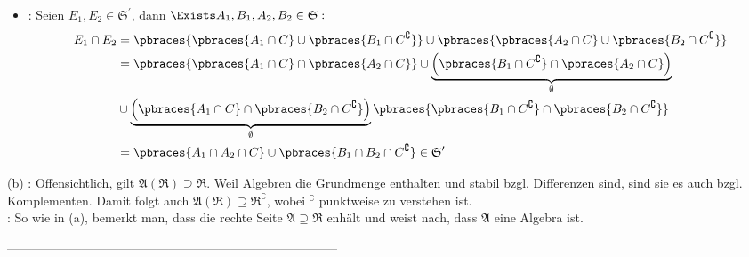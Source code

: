 \begin{solution}
\begin{itemize}
\begin{itemize}
    \item {}: Seien $E_1, E_2 \in \mathfrak{S}^\prime$, dann $\Exists A_1, B_1, A_2, B_2 \in \mathfrak{S}:$
    \begin{align*}
      E_1 \cap E_2
      & = \pbraces{\pbraces{A_1 \cap C} \cup \pbraces{B_1 \cap C^\complement}} \cup
        \pbraces{\pbraces{A_2 \cap C} \cup \pbraces{B_2 \cap C^\complement}} \\
      & = \pbraces{\pbraces{A_1 \cap C} \cap \pbraces{A_2 \cap C}} \cup
          \underbrace
          {
            \Big (
            \pbraces{B_1 \cap C^\complement} \cap \pbraces{A_2 \cap C}
            \Big )
          }_\emptyset \\
      & \cup \underbrace
          {
            \Big (
            \pbraces{A_1 \cap C} \cap \pbraces{B_2 \cap C^\complement}
            \Big )
            }_\emptyset
            \pbraces
          {
            \pbraces{B_1 \cap C^\complement} \cap
            \pbraces{B_2 \cap C^\complement}
          } \\
      & = \pbraces{A_1 \cap A_2 \cap C} \cup
          \pbraces{B_1 \cap B_2 \cap C^\complement}
          \in \mathfrak{S}^\prime
    \end{align*}

  \end{itemize}

\end{itemize}

(b) \Quote{$\supseteq$}: Offensichtlich, gilt $\mathfrak{A}(\mathfrak{R}) \supseteq \mathfrak{R}$. Weil Algebren die Grundmenge enthalten und stabil bzgl. Differenzen sind, sind sie es auch bzgl. Komplementen. Damit folgt auch $\mathfrak{A}(\mathfrak{R}) \supseteq \mathfrak{R}^\complement$, wobei $^\complement$ punktweise zu verstehen ist. \\

\Quote{$\subseteq$}: So wie in (a), bemerkt man, dass die rechte Seite $\mathfrak{A} \supseteq \mathfrak{R}$ enhält und weist nach, dass $\mathfrak{A}$ eine Algebra ist.

\end{solution}

--------------------------------------------------------------------------------

